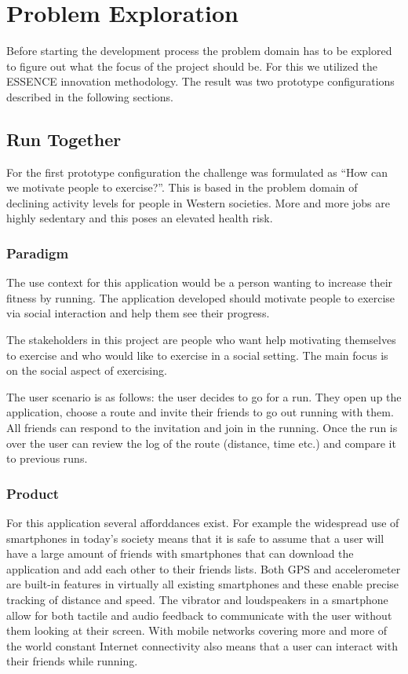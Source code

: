 \section{Problem Exploration}
\label{sec:problem-exp}
Before starting the development process the problem domain has to be explored to figure out what the focus of the project should be. For this we utilized the ESSENCE innovation methodology. The result was two prototype configurations described in the following sections.

\subsection{Run Together}
For the first prototype configuration the challenge was formulated as ``How can we motivate people to exercise?''. This is based in the problem domain of declining activity levels for people in Western societies. More and more jobs are highly sedentary and this poses an elevated health risk. 

\subsubsection{Paradigm}
The use context for this application would be a person wanting to increase their fitness by running. The application developed should motivate people to exercise via social interaction and help them see their progress.

The stakeholders in this project are people who want help motivating themselves to exercise and who would like to exercise in a social setting. The main focus is on the social aspect of exercising. 

The user scenario is as follows: the user decides to go for a run. They open up the application, choose a route and invite their friends to go out running with them. All friends can respond to the invitation and join in the running. Once the run is over the user can review the log of the route (distance, time etc.) and compare it to previous runs.  

\subsubsection{Product}
For this application several afforddances exist. For example the widespread use of smartphones in today's society means that it is safe to assume that a user will have a large amount of friends with smartphones that can download the application and add each other to their friends lists. Both \ac{GPS} and accelerometer are built-in features in virtually all existing smartphones and these enable precise tracking of distance and speed. The vibrator and loudspeakers in a smartphone allow for both tactile and audio feedback to communicate with the user without them looking at their screen. With mobile networks covering more and more of the world constant Internet connectivity also means that a user can interact with their friends while running.

